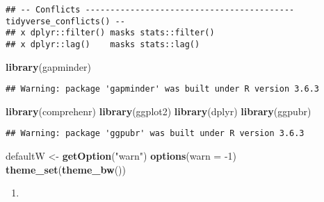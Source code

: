 \documentclass[
]{article}
\newenvironment{Shaded}{\begin{snugshade}}{\end{snugshade}}
\newcommand{\DataTypeTok}[1]{\textcolor[rgb]{0.13,0.29,0.53}{#1}}
\newcommand{\DecValTok}[1]{\textcolor[rgb]{0.00,0.00,0.81}{#1}}
\newcommand{\KeywordTok}[1]{\textcolor[rgb]{0.13,0.29,0.53}{\textbf{#1}}}
\newcommand{\NormalTok}[1]{#1}
\newcommand{\StringTok}[1]{\textcolor[rgb]{0.31,0.60,0.02}{#1}}
\begin{document}
\begin{verbatim}
## -- Conflicts ------------------------------------------ tidyverse_conflicts() --
## x dplyr::filter() masks stats::filter()
## x dplyr::lag()    masks stats::lag()
\end{verbatim}

\begin{Shaded}
\begin{Highlighting}[]
\KeywordTok{library}\NormalTok{(gapminder)}
\end{Highlighting}
\end{Shaded}

\begin{verbatim}
## Warning: package 'gapminder' was built under R version 3.6.3
\end{verbatim}

\begin{Shaded}
\begin{Highlighting}[]
\KeywordTok{library}\NormalTok{(comprehenr)}
\KeywordTok{library}\NormalTok{(ggplot2)}
\KeywordTok{library}\NormalTok{(dplyr)}
\KeywordTok{library}\NormalTok{(ggpubr)}
\end{Highlighting}
\end{Shaded}

\begin{verbatim}
## Warning: package 'ggpubr' was built under R version 3.6.3
\end{verbatim}

\begin{Shaded}
\begin{Highlighting}[]
\NormalTok{defaultW <-}\StringTok{ }\KeywordTok{getOption}\NormalTok{(}\StringTok{"warn"}\NormalTok{)}
\KeywordTok{options}\NormalTok{(}\DataTypeTok{warn =} \DecValTok{-1}\NormalTok{)}
\KeywordTok{theme_set}\NormalTok{(}\KeywordTok{theme_bw}\NormalTok{())}
\end{Highlighting}
\end{Shaded}

\begin{enumerate}
\def\labelenumi{\alph{enumi})}
\item
\end{enumerate}
\end{document}
